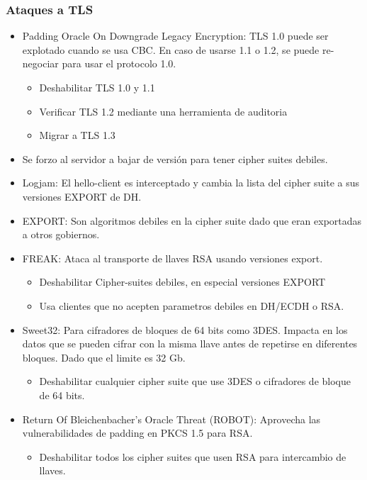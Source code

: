\documentclass[11pt]{article}
\begin{document}
\subsubsection{Ataques a TLS}
\label{sec:org9bd3261}
\begin{itemize}
\item Padding Oracle On Downgrade Legacy Encryption: TLS 1.0 puede ser explotado cuando se usa CBC. En caso de usarse 1.1 o 1.2, se puede re-negociar para usar el protocolo 1.0.
\begin{itemize}
\item Deshabilitar TLS 1.0 y 1.1
\item Verificar TLS 1.2 mediante una herramienta de auditoria
\item Migrar a TLS 1.3
\end{itemize}

\item Se forzo al servidor a bajar de versión para tener cipher suites debiles.

\item Logjam: El hello-client es interceptado y cambia la lista del cipher suite a sus versiones EXPORT de DH.
\item EXPORT: Son algoritmos debiles en la cipher suite dado que eran exportadas a otros gobiernos.
\item FREAK: Ataca al transporte de llaves RSA usando versiones export.
\begin{itemize}
\item Deshabilitar Cipher-suites debiles, en especial versiones EXPORT
\item Usa clientes que no acepten parametros debiles en DH/ECDH o RSA.
\end{itemize}

\item Sweet32: Para cifradores de bloques de 64 bits como 3DES. Impacta en los datos que se pueden cifrar con la misma llave antes de repetirse en diferentes bloques. Dado que el limite es 32 Gb.
\begin{itemize}
\item Deshabilitar cualquier cipher suite que use 3DES o cifradores de bloque de 64 bits.
\end{itemize}

\item Return Of Bleichenbacher's Oracle Threat (ROBOT): Aprovecha las vulnerabilidades de padding en PKCS 1.5 para RSA.
\begin{itemize}
\item Deshabilitar todos los cipher suites que usen RSA para intercambio de llaves.
\end{itemize}


\end{itemize}
\end{document}
